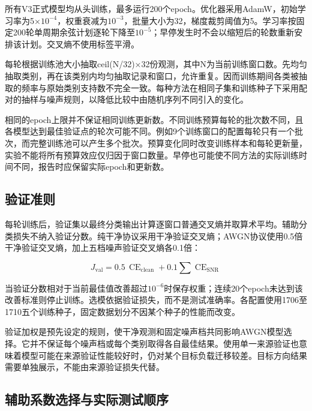 \documentclass[UTF8,12pt,openany,twoside]{ctexbook}
\numberwithin{equation}{chapter}
\begin{document}
所有V3正式模型均从头训练，最多运行200个epoch。优化器采用AdamW，初始学习率为5×$10^{-4}$，权重衰减为$10^{-3}$，批量大小为32，梯度裁剪阈值为5。学习率按固定200轮单周期余弦计划逐轮下降至$10^{-5}$；早停发生时不会以缩短后的轮数重新安排该计划。交叉熵不使用标签平滑。

每轮根据训练池大小抽取ceil(N/32)×32份观测，其中N为当前训练窗口数。先均匀抽取类别，再在该类别内均匀抽取记录和窗口，允许重复。因而训练期间各类被抽取的频率与原始类别支持数不完全一致。每种方法在相同子集和训练种子下采用配对的抽样与噪声规则，以降低比较中由随机序列不同引入的变化。

相同的epoch上限并不保证相同训练更新数。不同训练预算每轮的批次数不同，且各模型达到最佳验证点的轮次可能不同。例如9个训练窗口的配置每轮只有一个批次，而完整训练池可以产生多个批次。预算变化同时改变训练样本和每轮更新量，实验不能将所有预算效应仅归因于窗口数量。早停也可能使不同方法的实际训练时间不同，报告时应保留实际epoch和更新数。

\subsection{验证准则}\label{ux9a8cux8bc1ux51c6ux5219}

每轮训练后，验证集以最终分类输出计算逐窗口普通交叉熵并取算术平均。辅助分类损失不纳入验证分数。纯干净协议采用干净验证交叉熵；AWGN协议使用0.5倍干净验证交叉熵，加上五档噪声验证交叉熵各0.1倍：

\begin{equation}
\label{eq:auto15}
J_{\mathrm{val}}=0.5\,\operatorname{CE}_{\mathrm{clean}}+0.1\sum\operatorname{CE}_{\mathrm{SNR}}
\end{equation}


当验证分数相对于当前最佳值改善超过$10^{-6}$时保存权重；连续20个epoch未达到该改善标准则停止训练。选模依据验证损失，而不是测试准确率。各配置使用1706至1710五个训练种子，固定数据划分不因某个种子的性能而改变。

验证加权是预先设定的规则，使干净观测和固定噪声档共同影响AWGN模型选择。它并不保证每个噪声档或每个类别取得各自最佳结果。使用单一来源验证也意味着模型可能在来源验证性能较好时，仍对某个目标负载迁移较差。目标方向结果需要单独展示，不能由来源验证损失代替。

\subsection{辅助系数选择与实际测试顺序}\label{ux8f85ux52a9ux7cfbux6570ux9009ux62e9ux4e0eux5b9eux9645ux6d4bux8bd5ux987aux5e8f}
\end{document}
